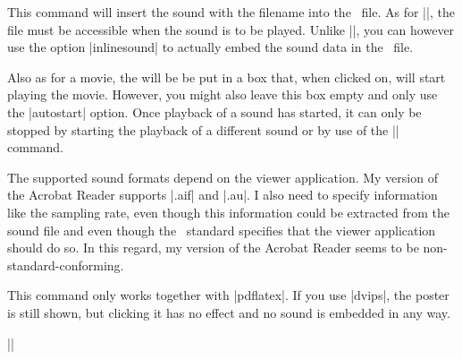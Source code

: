 \begin{command}{\sound{}}
  This command will insert the sound with the filename  into the \pdf\ file. As for |\movie|, the file must be
  accessible when the sound is to be played. Unlike |\movie|, you can
  however use the option |inlinesound| to actually embed the sound
  data in the \pdf\ file.

  Also as for a movie, the  will be be put in
  a box that, when clicked on, will start playing the movie. However,
  you might also leave this box empty and only use the |autostart|
  option. Once playback of a sound has started, it can only be stopped
  by starting the playback of a different sound or by use of the
  |\hyperlinkmute| command.

  The supported sound formats depend on the viewer application. My
  version of the Acrobat Reader supports |.aif| and |.au|. I also need
  to specify information like the sampling rate, even though this
  information could be extracted from the sound file and even though
  the \pdf\ standard specifies that the viewer application should do
  so. In this regard, my version of the Acrobat Reader seems to be
  non-standard-conforming.

  This command only works together with |pdflatex|. If you use
  |dvips|, the poster is still shown, but clicking it has no effect
  and no sound is embedded in any way.

  \example
  ||


\end{command}
